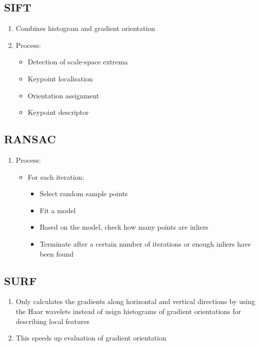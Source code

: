 \documentclass[9pt]{article}
\begin{document}
\begin{multicols*}{2}
        \subsection{SIFT}
        \begin{enumerate}
            \item Combines histogram and gradient orientation 
            
            \item Process:
            \begin{itemize}
                \item Detection of scale-space extrema 
                \item Keypoint localisation 
                \item Orientation assignment 
                \item Keypoint descriptor
            \end{itemize}
        \end{enumerate}

        \subsection{RANSAC}
        \begin{enumerate}
            \item Process: 
            \begin{itemize}
                \item For each iteration:
                \begin{itemize}
                    \item Select random sample points
                    \item Fit a model
                    \item Based on the model, check how many points are inliers
                    \item Terminate after a certain number of iterations or enough inliers have been found
                \end{itemize}
            \end{itemize}
        \end{enumerate}

        \subsection{SURF}
        \begin{enumerate}
            \item Only calculates the gradients along horizontal and vertical directions by using the Haar
            wavelets instead of usign histograms of gradient orientations for describing local features
            \item This speeds up evaluation of gradient orientation 
        \end{enumerate}


\end{multicols*}
\end{document}
